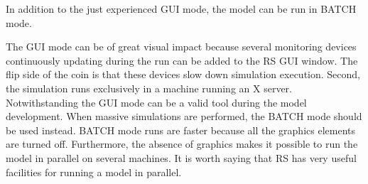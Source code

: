 \documentclass{article}
\begin{document}
In addition to the just experienced GUI mode, the model can be run in BATCH mode. 

The GUI mode can be of great visual impact because several monitoring devices continuously updating during the run can be added to the RS GUI window. The flip side of the coin is that these devices slow down simulation execution. Second, the simulation runs exclusively in a machine running an X server. Notwithstanding the GUI mode can be a valid tool during the model development. When massive simulations are performed, the BATCH mode should be used instead. BATCH mode runs are faster because all the graphics elements are turned off. Furthermore, the absence of graphics makes it possible to run the model in parallel on several machines. It is worth saying that RS has very useful facilities for running a model in parallel.
\end{document}
